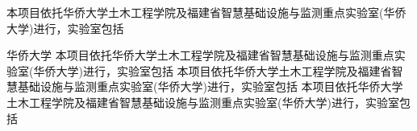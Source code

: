 本项目依托华侨大学土木工程学院及福建省智慧基础设施与监测重点实验室(华侨大学)进行，实验室包括

华侨大学
本项目依托华侨大学土木工程学院及福建省智慧基础设施与监测重点实验室(华侨大学)进行，实验室包括
本项目依托华侨大学土木工程学院及福建省智慧基础设施与监测重点实验室(华侨大学)进行，实验室包括
本项目依托华侨大学土木工程学院及福建省智慧基础设施与监测重点实验室(华侨大学)进行，实验室包括